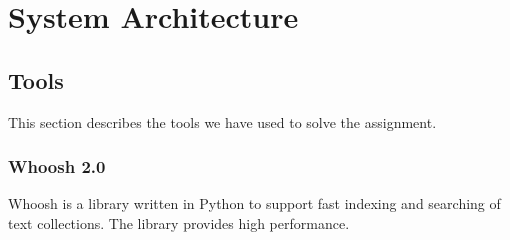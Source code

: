 \chapter{System Architecture}

\section{Tools}
This section describes the tools we have used to solve the assignment. 

\subsection{Whoosh 2.0}
Whoosh is a library written in Python to support fast indexing and searching of text collections. The library provides high performance. 
